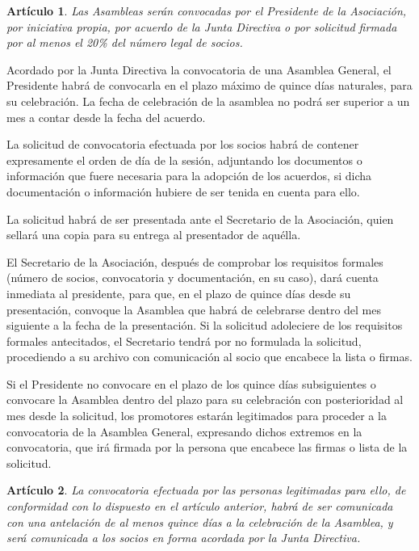 \documentclass[a4paper,12pt]{article}
\theoremstyle{mystyle}		%
\newtheorem{art}{Artículo}	%
\begin{document}
\begin{onehalfspace}
\begin{art}
Las Asambleas serán convocadas por el Presidente de la Asociación, por iniciativa propia, por acuerdo de la Junta Directiva o por solicitud firmada por al menos el 20\% del número legal de socios.
\end{art}

Acordado por la Junta Directiva la convocatoria de una Asamblea General, el Presidente habrá de convocarla en el plazo máximo de quince días naturales, para su celebración. La fecha de celebración de la asamblea no podrá ser superior a un mes a contar desde la fecha del acuerdo.

La solicitud de convocatoria efectuada por los socios habrá de contener expresamente el orden de día de la sesión, adjuntando los documentos o información que fuere necesaria para la adopción de los acuerdos, si dicha documentación o información hubiere de ser tenida en cuenta para ello.

La solicitud habrá de ser presentada ante el Secretario de la Asociación, quien sellará una copia para su entrega al presentador de aquélla.

El Secretario de la Asociación, después de comprobar los requisitos formales (número de socios, convocatoria y documentación, en su caso), dará cuenta inmediata al presidente, para que, en el plazo de quince días desde su presentación, convoque la Asamblea que habrá de celebrarse dentro del mes siguiente a la fecha de la presentación. Si la solicitud adoleciere de los requisitos formales antecitados, el Secretario tendrá por no formulada la solicitud, procediendo a su archivo con comunicación al socio que encabece la lista o firmas.

Si el Presidente no convocare en el plazo de los quince días subsiguientes o convocare la Asamblea dentro del plazo para su celebración con posterioridad al mes desde la solicitud, los promotores estarán legitimados para proceder a la convocatoria de la Asamblea General, expresando dichos extremos en la convocatoria, que irá firmada por la persona que encabece las firmas o lista de la solicitud.

\begin{art}
La convocatoria efectuada por las personas legitimadas para ello, de conformidad con lo dispuesto en el artículo anterior, habrá de ser comunicada con una antelación de al menos quince días a la celebración de la Asamblea, y será comunicada a los socios en forma acordada por la Junta Directiva.
\end{art}


\end{onehalfspace}
\end{document}
